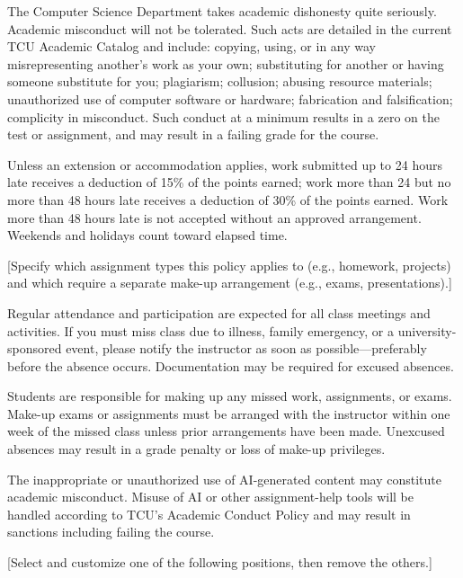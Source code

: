 The Computer Science Department takes academic dishonesty quite seriously. Academic misconduct will not be tolerated. Such acts are detailed in the current TCU Academic Catalog and include: copying, using, or in any way misrepresenting another's work as your own; substituting for another or having someone substitute for you; plagiarism; collusion; abusing resource materials; unauthorized use of computer software or hardware; fabrication and falsification; complicity in misconduct. Such conduct at a minimum results in a zero on the test or assignment, and may result in a failing grade for the course.

Unless an extension or accommodation applies, work submitted up to 24 hours late receives a deduction of 15\% of the points earned; work more than 24 but no more than 48 hours late receives a deduction of 30\% of the points earned. Work more than 48 hours late is not accepted without an approved arrangement. Weekends and holidays count toward elapsed time.

[Specify which assignment types this policy applies to (e.g., homework, projects) and which require a separate make-up arrangement (e.g., exams, presentations).]

Regular attendance and participation are expected for all class meetings and activities. If you must miss class due to illness, family emergency, or a university-sponsored event, please notify the instructor as soon as possible---preferably before the absence occurs. Documentation may be required for excused absences.

Students are responsible for making up any missed work, assignments, or exams. Make-up exams or assignments must be arranged with the instructor within one week of the missed class unless prior arrangements have been made. Unexcused absences may result in a grade penalty or loss of make-up privileges.

The inappropriate or unauthorized use of AI-generated content may constitute academic misconduct. Misuse of AI or other assignment-help tools will be handled according to TCU's Academic Conduct Policy and may result in sanctions including failing the course.

[Select and customize one of the following positions, then remove the others.]

